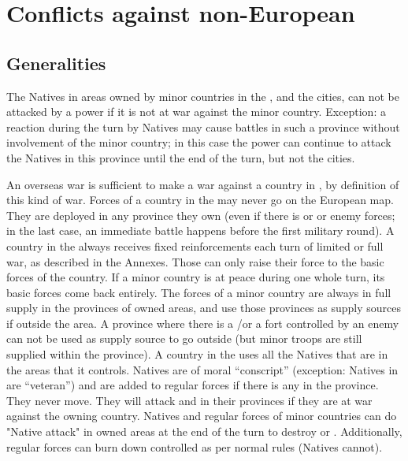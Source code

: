
\section{Conflicts against non-European}
\subsection{Generalities}
The Natives in areas owned by minor countries in the \ROTW, and the
cities, can not be attacked by a power if it is not at war against the
minor country. Exception: a reaction during the turn by Natives may
cause battles in such a province without involvement of the minor
country; in this case the power can continue to attack the Natives in
this province until the end of the turn, but not the cities.

An overseas war is sufficient to make a war against a country in \ROTW,
by definition of this kind of war.
\bparag Forces of a country in the \ROTW may never go on the European
map. They are deployed in any province they own (even if there is \COL
or \TP or enemy forces; in the last case, an immediate battle happens
before the first military round).
\bparag A country in the \ROTW always receives fixed reinforcements each
turn of limited or full war, as described in the Annexes. Those can only
raise their force to the basic forces of the country.
\bparag If a minor country is at peace during one whole turn, its basic
forces come back entirely.
\bparag The forces of a minor country are always in full supply in the
provinces of owned areas, and use those provinces as supply sources if
outside the area. A province where there is a \TP/\COL or a fort
controlled by an enemy can not be used as supply source to go outside
(but minor troops are still supplied within the province).
\bparag A country in the \ROTW uses all the Natives that are in the
areas that it controls. Natives are of moral ``conscript'' (exception:
Natives in  are ``veteran'') and are added to
regular forces if there is any in the province. They never move.  They
will attack \TP and \COL in their provinces if they are at war against
the owning country.
\bparag Natives and regular forces of minor countries can do "Native
attack" in owned areas at the end of the turn to destroy \COL or \TP.
Additionally, regular forces can burn down controlled \TP as per normal
rules (Natives cannot).

